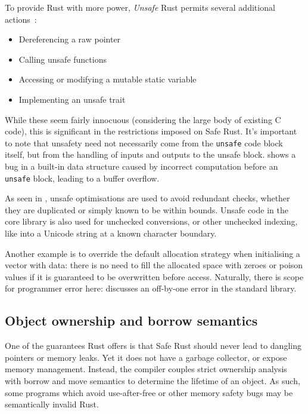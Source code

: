 \documentclass[dissertation.tex]{subfiles}
\begin{document}
To provide Rust with more power, \emph{Unsafe} Rust permits several
additional actions~\cite{rust-trpl-book}:

\begin{itemize}
    \item Dereferencing a raw pointer
    \item Calling unsafe functions
    \item Accessing or modifying a mutable static variable
    \item Implementing an unsafe trait
\end{itemize}

While these seem fairly innocuous (considering the large body of
existing C code), this is significant in the restrictions imposed on
Safe Rust.
It's important to note that unsafety need not necessarily come from
the \texttt{unsafe} code block itself, but from the handling of inputs
and outputs to the unsafe block.
 shows a bug in a built-in data structure
caused by incorrect computation before an \texttt{unsafe} block, leading
to a buffer overflow.

As seen in , unsafe optimisations are used to
avoid redundant checks, whether they are duplicated or simply known to
be within bounds.
Unsafe code in the core library is also used for unchecked conversions,
or other unchecked indexing, like into a Unicode string at a known
character boundary.

Another example is to override the default allocation strategy
when initialising a vector with data: there is no need to fill the
allocated space with zeroes or poison values if it is guaranteed to be
overwritten before access.
Naturally, there is scope for programmer error here:
 discusses an off-by-one error in
the standard library.


\subsection{Object ownership and borrow semantics}
\label{sec:rust-borrow}


One of the guarantees Rust offers is that Safe Rust should never lead to
dangling pointers or memory leaks.
Yet it does not have a garbage collector, or expose memory management.
Instead, the compiler couples strict ownership analysis with borrow and
move semantics to determine the lifetime of an object.
As such, some programs which avoid use-after-free or other memory safety
bugs may be semantically invalid Rust.
\end{document}
